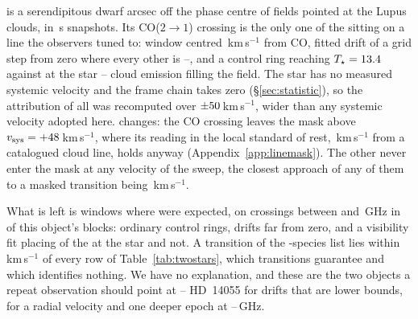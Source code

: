 \BkAlmaName{} is a serendipitous dwarf \TwPbJx{} arcsec off the phase centre
of fields pointed at the Lupus clouds, in \TwOnSrcJx\,s snapshots. Its
CO($2\to1$) crossing is the only one of the \TwNCrossBoth{} sitting on a line
the observers tuned to: window centred \TwTunedCenKms\,km\,s$^{-1}$ from CO,
fitted drift \TwStepMin{} of a grid step from zero where every other is
\TwStepNext--\TwStepMax, and a control ring reaching $T_\star=13.4$
against \TwTStarCtrlJx{} at the star -- cloud emission filling the field. The
star has no measured systemic velocity and the frame chain takes zero
(\S\ref{sec:statistic}), so the attribution of all \TwSweepNJxWord{} was recomputed over
$\pm50$\,km\,s$^{-1}$, wider than any systemic velocity adopted
here. \TwSweepNChangeJxWordCap{} changes: the CO crossing leaves the mask above
$v_{\rm sys}=+48$\,km\,s$^{-1}$, where its reading in the local
standard of rest, \LsLupDv\,km\,s$^{-1}$ from a catalogued cloud line, holds
anyway (Appendix~\ref{app:linemask}). The other \TwSweepNUnchJxWord{} never enter the
mask at any velocity of the sweep, the closest approach of any of them to a masked
transition being \TwSweepClosestKms\,km\,s$^{-1}$.

What is left is \TwNExcJxWord{} windows where \TwExpJx{} were expected, on \TwJxNCrossExcWord{}
crossings between \TwJxExcBandLo{} and \TwJxExcBandHi\,GHz in
\TwJxNBlockExcWord{} of this object's \TwJxNBlockWord{} blocks: ordinary control
rings, drifts far from zero, and a visibility fit placing
\TwJxNLocalExcWord{} of the \TwJxNCrossExcWord{} at the star and
\TwJxNNotLocalExcWord{} not. A transition of the \TwWideNSpecies-species list lies
within \TwWideDvMax\,km\,s$^{-1}$ of every row of Table~\ref{tab:twostars},
which \TwWideNTrans{} transitions guarantee and which identifies nothing. We
have no explanation, and these are the two objects a repeat observation
should point at -- HD~14055 for drifts that are lower bounds,
\BkAlmaName{} for a radial velocity and one deeper epoch at
\TwJxExcBandLo--\TwJxExcBandHi\,GHz.

\begin{table}
\centering
\caption{\textbf{Every crossing toward HD~14055 and \BkAlmaName.} Rates are
in the observatory frame; $\ge$ and $\le$ mark a fit on the grid's outermost
trial.}
\label{tab:twostars}
\scriptsize

\end{table}

